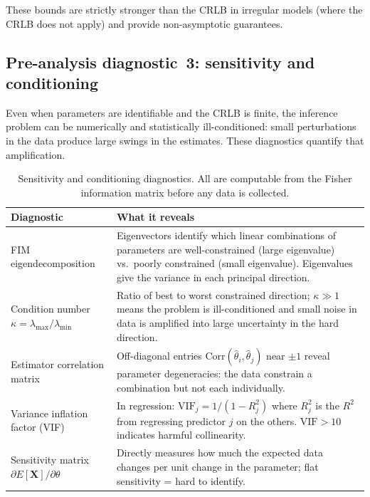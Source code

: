 \documentclass[11pt, a4paper]{article}
\begin{document}
\noindent These bounds are strictly stronger than the CRLB in irregular models
(where the CRLB does not apply) and provide non-asymptotic guarantees.

\subsection*{Pre-analysis diagnostic~3: sensitivity and conditioning}
\label{sec:sensitivity}

Even when parameters are identifiable and the CRLB is finite, the inference
problem can be numerically and statistically ill-conditioned: small perturbations
in the data produce large swings in the estimates.
These diagnostics quantify that amplification.

\begin{table}[h]
\centering
\caption{Sensitivity and conditioning diagnostics. All are computable from the
Fisher information matrix before any data is collected.}
\label{tab:sensitivity}
\renewcommand{\arraystretch}{1.4}
\begin{tabular}{p{4.0cm} p{9.2cm}}
\hline
\textbf{Diagnostic} & \textbf{What it reveals} \\
\hline
FIM eigendecomposition &
Eigenvectors identify which linear combinations of parameters are
well-constrained (large eigenvalue) vs.\ poorly constrained (small eigenvalue).
Eigenvalues give the variance in each principal direction. \\
Condition number $\kappa = \lambda_{\max}/\lambda_{\min}$ &
Ratio of best to worst constrained direction; $\kappa \gg 1$ means
the problem is ill-conditioned and small noise in data is amplified into
large uncertainty in the hard direction. \\
Estimator correlation matrix &
Off-diagonal entries $\mathrm{Corr}(\hat\theta_i,\hat\theta_j)$ near
$\pm 1$ reveal parameter degeneracies: the data constrain a combination
but not each individually. \\
Variance inflation factor (VIF) &
In regression: $\mathrm{VIF}_j = 1/(1-R_j^2)$ where $R_j^2$ is the
$R^2$ from regressing predictor $j$ on the others.
$\mathrm{VIF} > 10$ indicates harmful collinearity. \\
Sensitivity matrix $\partial E[\mathbf{X}]/\partial\theta$ &
Directly measures how much the expected data changes per unit change in
the parameter; flat sensitivity = hard to identify. \\
\hline
\end{tabular}
\end{table}
\end{document}
